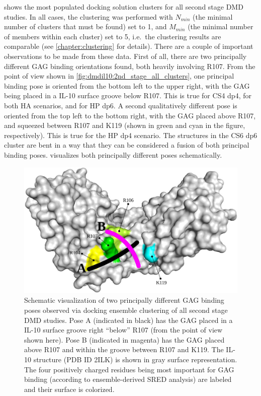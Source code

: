  shows the most populated docking
solution clusters for all second stage DMD studies. In all cases, the clustering
was performed with $N_{min}$ (the minimal number of clusters that must be found)
set to 1, and $M_{min}$ (the minimal number of members within each cluster) set
to 5, i.e.\ the clustering results are comparable (see \cref{chapter:clustering}
for details). There are a couple of important observations to be made from these
data. First of all, there are two principally different GAG binding orientations
found, both heavily involving R107. From the point of view shown in
\cref{fig:dmdil10:2nd_stage_all_clusters}, one principal binding pose is
oriented from the bottom left to the upper right, with the GAG being placed in a
IL-10 surface groove below R107. This is true for CS4 dp4, for both HA
scenarios, and for HP dp6. A second qualitatively different pose is oriented
from the top left to the bottom right, with the GAG placed above R107, and
squeezed between R107 and K119 (shown in green and cyan in the figure,
respectively). This is true for the HP dp4 scenario. The structures in the CS6
dp6 cluster are bent in a way that they can be considered a fusion of both
principal binding poses.  visualizes
both principally different poses schematically.

\begin{figure}
\centering
\includegraphics[width=1.0\textwidth]{gfx/dmdil10/principal_poses_06.jpg}
\caption[]{
Schematic visualization of two principally different GAG binding poses observed
via docking ensemble clustering of all second stage DMD studies. Pose A
(indicated in black) has the GAG placed in a IL-10 surface groove right
\enquote{below} R107 (from the point of view shown here). Pose B (indicated in
magenta) has the GAG placed above R107 and within the groove between R107 and
K119. The IL-10 structure (PDB ID 2ILK) is shown in gray surface representation.
The four positively charged residues being most important for GAG binding
(according to ensemble-derived SRED analysis) are labeled and their surface is
colorized.}
\label{fig:dmdil10:2nd_stage_principal_poses}
\end{figure}

